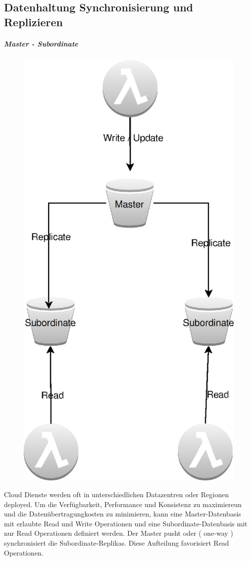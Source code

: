 \documentclass[
12pt,
english,
ngerman,
headsepline,
twoside,
openright,
numbers=noenddot,version=first
]{scrreprt}
\begin{document}
\subsection{Datenhaltung Synchronisierung und Replizieren}
\subparagraph{Master - Subordinate}
\begin{figure}
	\includegraphics[scale=0.2]{./pics/aws/pattern-master-subordinate-data-replication.eps}
\end{figure}
Cloud Dienste werden oft in unterschiedlichen Datazentren oder Regionen deployed. Um die Verfügbarkeit, Performance und Konsistenz zu maximiereun und die Datenübertragungkosten zu minimieren, kann eine Master-Datenbasis mit erlaubte Read und Write Operationen und eine Subordinate-Datenbasis mit nur Read Operationen definiert werden. 
Der Master pusht oder ( one-way ) synchronisiert die Subordinate-Replikas. 
Diese Aufteilung favorisiert Read Operationen.
\end{document}
